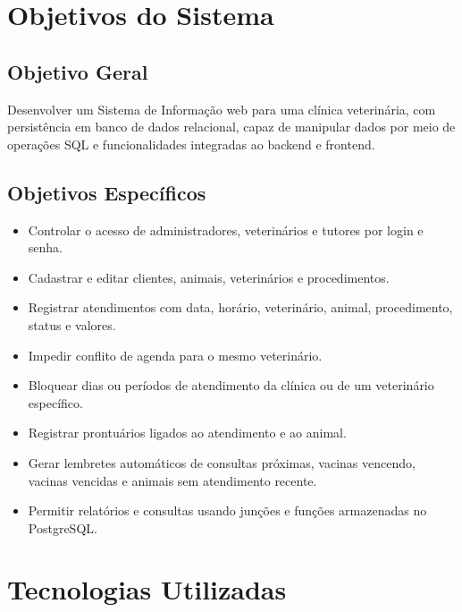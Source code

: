 \documentclass[12pt,a4paper]{article}
\begin{document}
\section{Objetivos do Sistema}

\subsection{Objetivo Geral}

Desenvolver um Sistema de Informação web para uma clínica veterinária, com persistência em banco de dados relacional, capaz de manipular dados por meio de operações SQL e funcionalidades integradas ao backend e frontend.

\subsection{Objetivos Específicos}

\begin{itemize}[leftmargin=*]
  \item Controlar o acesso de administradores, veterinários e tutores por login e senha.
  \item Cadastrar e editar clientes, animais, veterinários e procedimentos.
  \item Registrar atendimentos com data, horário, veterinário, animal, procedimento, status e valores.
  \item Impedir conflito de agenda para o mesmo veterinário.
  \item Bloquear dias ou períodos de atendimento da clínica ou de um veterinário específico.
  \item Registrar prontuários ligados ao atendimento e ao animal.
  \item Gerar lembretes automáticos de consultas próximas, vacinas vencendo, vacinas vencidas e animais sem atendimento recente.
  \item Permitir relatórios e consultas usando junções e funções armazenadas no PostgreSQL.
\end{itemize}

\section{Tecnologias Utilizadas}
\end{document}
